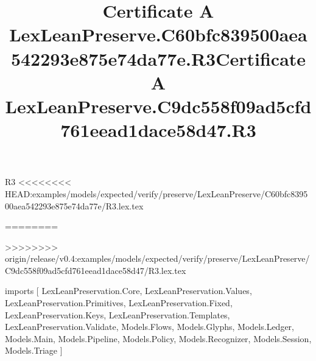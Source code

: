 \begin{lexlean}{R3}
<<<<<<<< HEAD:examples/models/expected/verify/preserve/LexLeanPreserve/C60bfc839500aea542293e875e74da77e/R3.lex.tex
\title{Certificate A LexLeanPreserve.C60bfc839500aea542293e875e74da77e.R3}
========
\title{Certificate A LexLeanPreserve.C9dc558f09ad5cfd761eead1dace58d47.R3}
>>>>>>>> origin/release/v0.4:examples/models/expected/verify/preserve/LexLeanPreserve/C9dc558f09ad5cfd761eead1dace58d47/R3.lex.tex
\begin{coremodule}
imports [
  LexLeanPreservation.Core,
  LexLeanPreservation.Values,
  LexLeanPreservation.Primitives,
  LexLeanPreservation.Fixed,
  LexLeanPreservation.Keys,
  LexLeanPreservation.Templates,
  LexLeanPreservation.Validate,
  Models.Flows,
  Models.Glyphs,
  Models.Ledger,
  Models.Main,
  Models.Pipeline,
  Models.Policy,
  Models.Recognizer,
  Models.Session,
  Models.Triage
]


\end{coremodule}
\end{lexlean}
